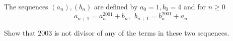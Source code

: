 The sequences $(a_n),(b_n)$ are defined by $a_0=1,b_0=4$ and for $n\ge 0$\[a_{n+1}=a_n^{2001}+b_n,\ \ b_{n+1}=b_n^{2001}+a_n\]

Show that $2003$ is not divisor of any of the terms in these two sequences.
